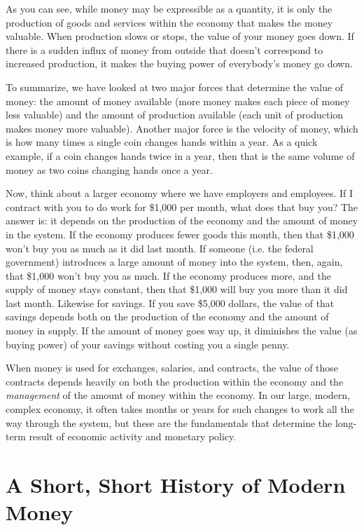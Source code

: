 As you can see, while money may be expressible as a quantity, it is only
the production of goods and services within the economy that makes
the money valuable. When production slows or stops, the value of your money
goes down. If there is a sudden influx of money from outside that doesn’t correspond
to increased production, it makes the buying power of everybody’s money go
down. 

To summarize, we have
looked at two major forces that determine the value of money: the
amount of money available (more money makes each piece of money less
valuable) and the amount of production available (each unit of
production makes money more valuable). Another major force is the
velocity of money, which is how many times a single coin changes hands
within a year. As a quick example, if a coin changes hands twice in a year, then that is
the same volume of money as two coins changing hands once a year.

Now, think about a larger economy where we have employers and employees.
If I contract with you to do work for \$1,000 per month, what does that
buy you?  The answer is: it depends on the production of the economy
and the amount of money in the system. If the economy produces fewer
goods this month, then that \$1,000 won’t buy you as much as it did
last month. If someone (i.e. the federal government) introduces a large amount of money into the
system, then, again, that \$1,000 won’t buy you as much. If the economy
produces more, and the supply of money stays constant, then that
\$1,000 will buy you more than it did last month. Likewise for savings.
If you save \$5,000 dollars, the value of that savings depends both on
the production of the economy and the amount of money in supply. If the
amount of money goes way up, it diminishes the value (as buying power)
of your savings without costing you a single penny.

When money is used for exchanges, salaries, and contracts, the value of
those contracts depends heavily on both the production within the
economy and the \textit{management} of the amount of money within the economy. 
In our large, modern, complex economy, it
often takes months or years for such changes to work all the way
through the system, but these are the fundamentals that determine the
long-term result of economic activity and monetary policy.

\section{A Short, Short History of Modern Money}

